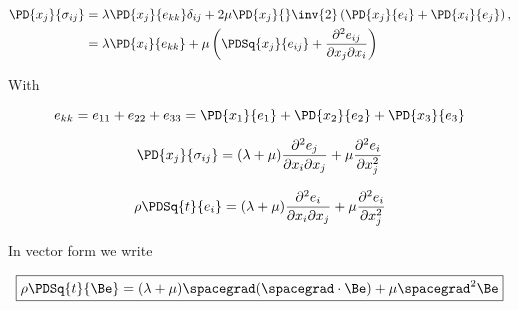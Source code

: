 \begin{align*}
\PD{x_j}{\sigma_{ij}}
&=
\lambda 
\PD{x_j}{
e_{kk}
}
\delta_{ij} + 2 \mu 
\PD{x_j}{
}
\inv{2} \left( 
\PD{x_j}{e_i}
+ \PD{x_i}{e_j} \right),
 \\
&=
\lambda 
\PD{x_i}{
e_{kk}
}
+ \mu 
\left(
\PDSq{x_j}{
e_{ij}
}
+
\frac{\partial^2 e_{ij} }{ \partial x_j \partial x_i}
\right)
\end{align*}

With 

\begin{equation}\label{eqn:continuumL6:230}
e_{kk} = e_{11} +e_{22} +e_{33}
= 
\PD{x_1}{e_1}
+\PD{x_2}{e_2}
+\PD{x_3}{e_3}
\end{equation}

\begin{equation}\label{eqn:continuumL6:250}
\PD{x_j}{\sigma_{ij}} = (\lambda + \mu) \frac{\partial^2 e_j}{\partial x_i \partial x_j}
+ \mu
\frac{\partial^2 e_i}
{\partial x_j^2
}
\end{equation}

\begin{equation}\label{eqn:continuumL6:270}
\rho \PDSq{t}{e_i} = (\lambda + \mu) \frac{\partial^2 e_i}{\partial x_i \partial x_j}
+ \mu
\frac{\partial^2 e_i}
{\partial x_j^2
}
\end{equation}

In vector form we write

\begin{equation}\label{eqn:continuumL6:290}
\boxed{
\rho \PDSq{t}{\Be} = (\lambda + \mu) \spacegrad (\spacegrad \cdot \Be) + \mu \spacegrad^2 \Be
}
\end{equation}

\EndArticle
